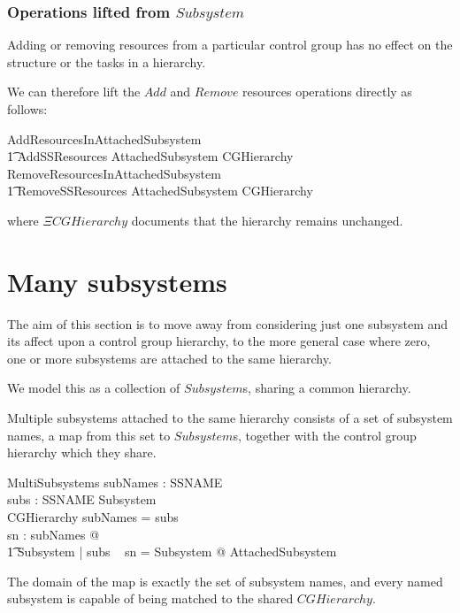 \documentclass[a4paper,twoside,12pt]{article}
\begin{document}
\subsubsection{Operations lifted from $Subsystem$}

Adding or removing resources from a particular control group has no effect on the structure or the tasks
in a hierarchy.

We can therefore lift the $Add$ and $Remove$ resources operations directly as follows:

\begin{zed}
AddResourcesInAttachedSubsystem  \\
\t1 AddSSResources \land \Delta AttachedSubsystem \land \Xi CGHierarchy
\also
RemoveResourcesInAttachedSubsystem  \\
\t1 RemoveSSResources \land \Delta AttachedSubsystem \land \Xi CGHierarchy
\end{zed}
where $\Xi CGHierarchy$ documents that the hierarchy remains unchanged.

\section{Many subsystems}
\label{sec:manyss}

The aim of this section is to move away from considering just one subsystem and its affect upon
a control group hierarchy, to the more general case where zero, one or more subsystems are attached
to the same hierarchy.

We model this as a collection of $Subsystem$s, sharing a common hierarchy.

Multiple subsystems attached to the same hierarchy consists of a set of subsystem names, a map from this set
to $Subsystem$s, together with the control group hierarchy which they share.
\begin{schema}{MultiSubsystems}
subNames : \finset SSNAME \\
subs : SSNAME \ffun Subsystem \\
CGHierarchy
\where
subNames = \dom subs \\
\forall sn : subNames @ \\
	\t1 \exists Subsystem | subs ~ sn = \theta Subsystem @ AttachedSubsystem 
\end{schema}
The domain of the map is exactly the set of subsystem names, and every named subsystem
is capable of being matched to the shared $CGHierarchy$.
\end{document}
